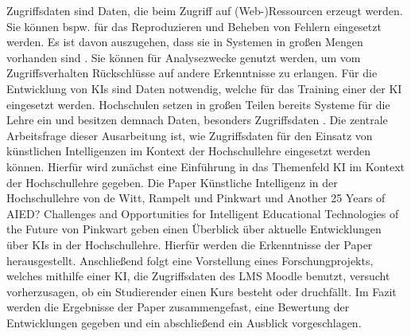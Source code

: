 \noindent
Zugriffsdaten sind Daten, die beim Zugriff auf (Web-)Ressourcen erzeugt werden.
Sie können bspw. für das Reproduzieren und Beheben von Fehlern eingesetzt werden.
Es ist davon auszugehen, dass sie in Systemen in großen Mengen vorhanden sind \cite[S. 3]{Quinn.2020}.
Sie können für Analysezwecke genutzt werden, um vom Zugriffsverhalten Rückschlüsse auf andere Erkenntnisse zu erlangen.
\noindent
Für die Entwicklung von KIs sind Daten notwendig, welche für das Training einer der KI eingesetzt werden.
Hochschulen setzen in großen Teilen bereits Systeme für die Lehre ein und besitzen demnach Daten, besonders Zugriffsdaten \cite[S. 3]{Quinn.2020}.
Die zentrale Arbeitsfrage dieser Ausarbeitung ist, wie Zugriffsdaten für den Einsatz von künstlichen Intelligenzen im Kontext der Hochschullehre eingesetzt werden können.
\noindent
Hierfür wird zunächst eine Einführung in das Themenfeld KI im Kontext der Hochschullehre gegeben.
Die Paper \glqq Künstliche Intelligenz in der Hochschullehre\grqq{} von de Witt, Rampelt und Pinkwart und \glqq Another 25 Years of AIED? Challenges and Opportunities for Intelligent Educational Technologies of the Future\grqq{} von Pinkwart geben einen Überblick über aktuelle Entwicklungen über KIs in der Hochschullehre.
Hierfür werden die Erkenntnisse der Paper herausgestellt.
Anschließend folgt eine Vorstellung eines Forschungprojekts, welches mithilfe einer KI, die Zugriffsdaten des \ac{LMS} Moodle benutzt, versucht vorherzusagen, ob ein Studierender einen Kurs besteht oder druchfällt.
Im Fazit werden die Ergebnisse der Paper zusammengefast, eine Bewertung der Entwicklungen gegeben und ein abschließend ein Ausblick vorgeschlagen.